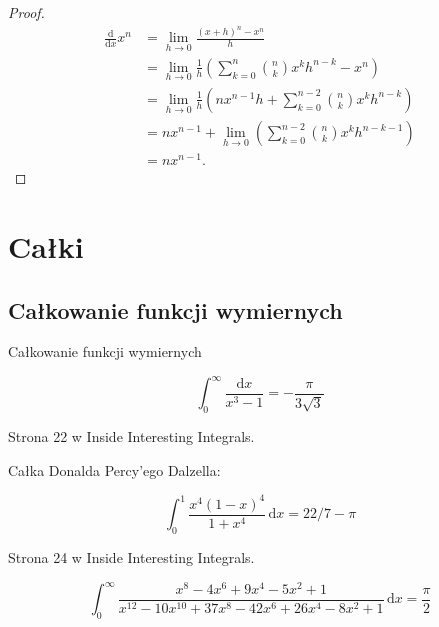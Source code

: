 \documentclass{parchment}
\begin{document}
\begin{proof}
\begin{align}
    \frac{\mathrm{d}}{\mathrm{d}x} x^n
    & = \lim_{h \to 0} \frac{(x+h)^n - x^n}{h} \\
    & = \lim_{h \to 0} \frac{1}{h} \left(\sum_{k=0}^n {n \choose k} x^k h^{n-k} - x^n \right) \\
    & = \lim_{h \to 0} \frac{1}{h} \left(nx^{n-1}h + \sum_{k=0}^{n-2} {n \choose k} x^k h^{n-k}\right) \\
    & = nx^{n-1} + \lim_{h \to 0} \left(\sum_{k=0}^{n-2} {n \choose k} x^k h^{n-k-1}\right) \\
    & = nx^{n-1}.
\end{align}
\end{proof}

\chapter{Całki}




\section{Całkowanie funkcji wymiernych}
Całkowanie funkcji wymiernych



\begin{integral}
\begin{equation}
    \int_0^\infty \frac{\mathrm{d}x}{x^3 - 1} = - \frac{\pi}{3\sqrt{3}}
\end{equation}
\end{integral}

\begin{solution}
    Strona 22 w Inside Interesting Integrals.
\end{solution}


Całka Donalda Percy'ego Dalzella:
\begin{integral}
\begin{equation}
    \int_0^1 \frac{x^4(1-x)^4}{1 + x^4} \,\mathrm{d}x = 22/7 - \pi
\end{equation}
\end{integral}

\begin{solution}
    Strona 24 w Inside Interesting Integrals.
\end{solution}


\begin{integral}
\begin{equation}
    \int_0^\infty \frac{x^8-4x^6+9x^4-5x^2+1}{x^{12}-10x^{10}+37x^8-42x^6+26x^4-8x^2+1} \,\mathrm{d}x = \frac{\pi}{2}
\end{equation}
\end{integral}
\end{document}

